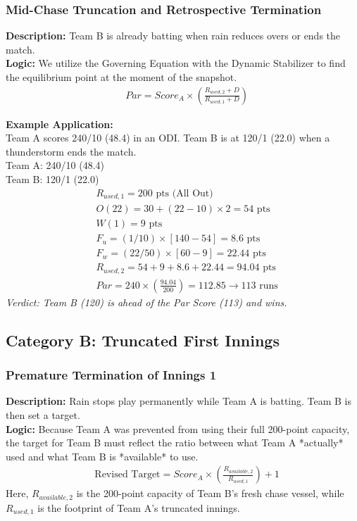 \documentclass[12pt, letterpaper, fleqn]{article}
\begin{document}
\subsubsection{Mid-Chase Truncation and Retrospective Termination}
\indent \textbf{Description:} Team B is already batting when rain reduces overs or ends the match. \\
\indent \textbf{Logic:} We utilize the Governing Equation with the Dynamic Stabilizer to find the equilibrium point at the moment of the snapshot.
\begin{align*}
& Par = Score_A \times \left( \frac{R_{used,2} + D}{R_{used,1} + D} \right)
\end{align*}

\indent \textbf{Example Application:} \\
Team A scores 240/10 (48.4) in an ODI. Team B is at 120/1 (22.0) when a thunderstorm ends the match. \\
Team A: 240/10 (48.4) \\
Team B: 120/1 (22.0) \\
\begin{align*}
& R_{used,1} = 200 \text{ pts (All Out)} \\
& O(22) = 30 + (22-10) \times 2 = 54 \text{ pts} \\
& W(1) = 9 \text{ pts} \\
& F_u = (1/10) \times [140 - 54] = 8.6 \text{ pts} \\
& F_w = (22/50) \times [60 - 9] = 22.44 \text{ pts} \\
& R_{used,2} = 54 + 9 + 8.6 + 22.44 = 94.04 \text{ pts} \\
& Par = 240 \times \left( \frac{94.04}{200} \right) = 112.85 \rightarrow 113 \text{ runs}
\end{align*}
\indent \textit{Verdict: Team B (120) is ahead of the Par Score (113) and wins.}

\subsection{Category B: Truncated First Innings}

\subsubsection{Premature Termination of Innings 1}
\indent \textbf{Description:} Rain stops play permanently while Team A is batting. Team B is then set a target. \\
\indent \textbf{Logic:} Because Team A was prevented from using their full 200-point capacity, the target for Team B must reflect the ratio between what Team A *actually* used and what Team B is *available* to use.
\begin{align*}
& \text{Revised Target} = Score_A \times \left( \frac{R_{available,2}}{R_{used,1}} \right) + 1
\end{align*}
\indent Here, $R_{available,2}$ is the 200-point capacity of Team B's fresh chase vessel, while $R_{used,1}$ is the footprint of Team A's truncated innings.
\end{document}
